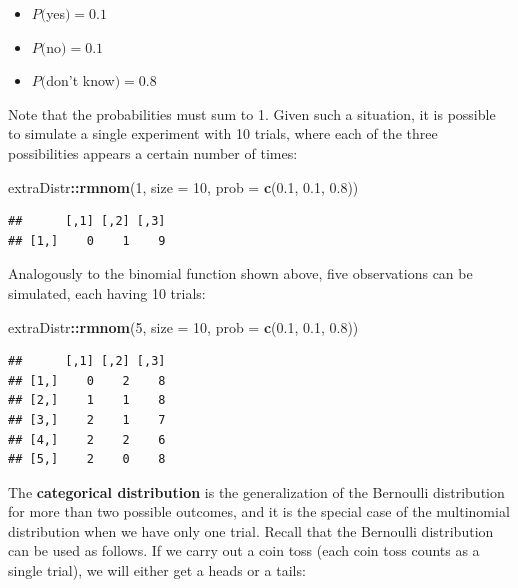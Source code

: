 \documentclass[12pt,]{krantz}
\newenvironment{Shaded}{\begin{snugshade}}{\end{snugshade}}
\newcommand{\KeywordTok}[1]{\textcolor[rgb]{0.13,0.29,0.53}{\textbf{#1}}}
\newcommand{\DataTypeTok}[1]{\textcolor[rgb]{0.13,0.29,0.53}{#1}}
\newcommand{\DecValTok}[1]{\textcolor[rgb]{0.00,0.00,0.81}{#1}}
\newcommand{\FloatTok}[1]{\textcolor[rgb]{0.00,0.00,0.81}{#1}}
\newcommand{\OperatorTok}[1]{\textcolor[rgb]{0.81,0.36,0.00}{\textbf{#1}}}
\newcommand{\NormalTok}[1]{#1}
\providecommand{\tightlist}{%
  \setlength{\itemsep}{0pt}\setlength{\parskip}{0pt}}
\theoremstyle{definition}
\theoremstyle{definition}
\theoremstyle{definition}
\theoremstyle{remark}
\begin{document}
\begin{itemize}
\tightlist
\item
  \(P(\)yes\()=0.1\)
\item
  \(P(\)no\()=0.1\)
\item
  \(P(\)don't know\()=0.8\)
\end{itemize}

Note that the probabilities must sum to 1. Given such a situation, it is
possible to simulate a single experiment with 10 trials, where each of
the three possibilities appears a certain number of times:

\begin{Shaded}
\begin{Highlighting}[]
\NormalTok{extraDistr}\OperatorTok{::}\KeywordTok{rmnom}\NormalTok{(}\DecValTok{1}\NormalTok{, }\DataTypeTok{size =} \DecValTok{10}\NormalTok{, }\DataTypeTok{prob =} \KeywordTok{c}\NormalTok{(}\FloatTok{0.1}\NormalTok{, }\FloatTok{0.1}\NormalTok{, }\FloatTok{0.8}\NormalTok{))}
\end{Highlighting}
\end{Shaded}

\begin{verbatim}
##      [,1] [,2] [,3]
## [1,]    0    1    9
\end{verbatim}

Analogously to the binomial function shown above, five observations can
be simulated, each having 10 trials:

\begin{Shaded}
\begin{Highlighting}[]
\NormalTok{extraDistr}\OperatorTok{::}\KeywordTok{rmnom}\NormalTok{(}\DecValTok{5}\NormalTok{, }\DataTypeTok{size =} \DecValTok{10}\NormalTok{, }\DataTypeTok{prob =} \KeywordTok{c}\NormalTok{(}\FloatTok{0.1}\NormalTok{, }\FloatTok{0.1}\NormalTok{, }\FloatTok{0.8}\NormalTok{))}
\end{Highlighting}
\end{Shaded}

\begin{verbatim}
##      [,1] [,2] [,3]
## [1,]    0    2    8
## [2,]    1    1    8
## [3,]    2    1    7
## [4,]    2    2    6
## [5,]    2    0    8
\end{verbatim}

The \textbf{categorical distribution} is the generalization of the
Bernoulli distribution for more than two possible outcomes, and it is
the special case of the multinomial distribution when we have only one
trial. Recall that the Bernoulli distribution can be used as follows. If
we carry out a coin toss (each coin toss counts as a single trial), we
will either get a heads or a tails:
\end{document}
